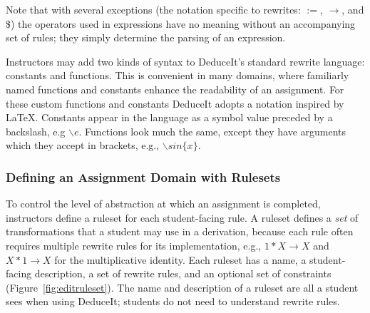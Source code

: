 \documentclass{sigchi}
\begin{document}
Note that with several exceptions (the notation specific to rewrites: $:=$, $\rightarrow$, and $\$$) the operators used in expressions have no meaning without an accompanying set of rules; they simply determine the parsing of an expression.

Instructors may add two kinds of syntax to DeduceIt's standard rewrite language: constants and functions. This is convenient in many domains, where familiarly named functions and constants enhance the readability of an assignment. For these custom functions and constants DeduceIt adopts a notation inspired by LaTeX. Constants appear in the language as a symbol value preceded by a backslash, e.g $\backslash{}e$. Functions look much the same, except they have arguments which they accept in brackets, e.g., $\backslash{}sin\{x\}$.

\subsubsection{Defining an Assignment Domain with Rulesets}

To control the level of abstraction at which an assignment is completed, instructors define a ruleset for each student-facing rule. A ruleset defines a \textit{set} of transformations that a student may use in a derivation, because each rule often requires multiple rewrite rules for its implementation, e.g., $1*X \rightarrow X$ and $X*1 \rightarrow X$ for the multiplicative identity. Each ruleset has a name, a student-facing description, a set of rewrite rules, and an optional set of constraints (Figure~\ref{fig:editruleset}). The name and description of a ruleset are all a student sees when using DeduceIt; students do not need to understand rewrite rules.
\end{document}
